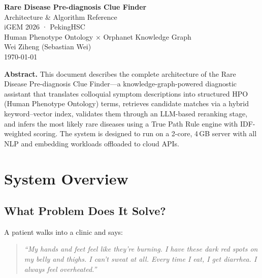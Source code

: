 \documentclass[11pt,a4paper]{article}
\begin{document}
\begin{titlepage}
\vspace*{3cm}
\begin{center}
{\Huge\bfseries\color{accent} Rare Disease Pre-diagnosis Clue Finder}\\[0.5cm]
{\Large Architecture \& Algorithm Reference}\\[1.5cm]
{\large iGEM 2026 · PekingHSC}\\[0.3cm]
{\large Human Phenotype Ontology × Orphanet Knowledge Graph}\\[2cm]
{\normalsize Wei Ziheng (Sebastian Wei)}\\[0.3cm]
{\small \today}
\end{center}
\vfill
\begin{callout}
\textbf{Abstract.} This document describes the complete architecture of the Rare Disease Pre-diagnosis Clue Finder—a knowledge-graph-powered diagnostic assistant that translates colloquial symptom descriptions into structured HPO (Human Phenotype Ontology) terms, retrieves candidate matches via a hybrid keyword–vector index, validates them through an LLM-based reranking stage, and infers the most likely rare diseases using a True Path Rule engine with IDF-weighted scoring. The system is designed to run on a 2-core, 4\,GB server with all NLP and embedding workloads offloaded to cloud APIs.
\end{callout}
\end{titlepage}

\tableofcontents
\newpage

\section{System Overview}

\subsection{What Problem Does It Solve?}

A patient walks into a clinic and says:

\begin{quote}
\itshape
``My hands and feet feel like they're burning. I have these dark red spots on my belly and thighs. I can't sweat at all. Every time I eat, I get diarrhea. I always feel overheated.''
\end{quote}
\end{document}
